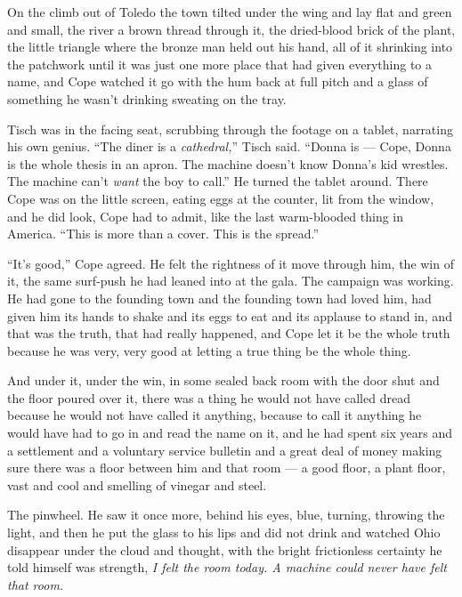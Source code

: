 \documentclass[11pt,openany]{book}
\newcommand{\scenebreak}{\par\vspace{0.5\baselineskip}\begin{center}\textasteriskcentered\quad\textasteriskcentered\quad\textasteriskcentered\end{center}\vspace{0.5\baselineskip}\par}
\begin{document}
\scenebreak


On the climb out of Toledo the town tilted under the wing and lay flat and green and small, the river a brown thread through it, the dried-blood brick of the plant, the little triangle where the bronze man held out his hand, all of it shrinking into the patchwork until it was just one more place that had given everything to a name, and Cope watched it go with the hum back at full pitch and a glass of something he wasn't drinking sweating on the tray.

Tisch was in the facing seat, scrubbing through the footage on a tablet, narrating his own genius. ``The diner is a \textit{cathedral,}'' Tisch said. ``Donna is --- Cope, Donna is the whole thesis in an apron. The machine doesn't know Donna's kid wrestles. The machine can't \textit{want} the boy to call.'' He turned the tablet around. There Cope was on the little screen, eating eggs at the counter, lit from the window, and he did look, Cope had to admit, like the last warm-blooded thing in America. ``This is more than a cover. This is the spread.''

``It's good,'' Cope agreed. He felt the rightness of it move through him, the win of it, the same surf-push he had leaned into at the gala. The campaign was working. He had gone to the founding town and the founding town had loved him, had given him its hands to shake and its eggs to eat and its applause to stand in, and that was the truth, that had really happened, and Cope let it be the whole truth because he was very, very good at letting a true thing be the whole thing.

And under it, under the win, in some sealed back room with the door shut and the floor poured over it, there was a thing he would not have called dread because he would not have called it anything, because to call it anything he would have had to go in and read the name on it, and he had spent six years and a settlement and a voluntary service bulletin and a great deal of money making sure there was a floor between him and that room --- a good floor, a plant floor, vast and cool and smelling of vinegar and steel.

The pinwheel. He saw it once more, behind his eyes, blue, turning, throwing the light, and then he put the glass to his lips and did not drink and watched Ohio disappear under the cloud and thought, with the bright frictionless certainty he told himself was strength, \textit{I felt the room today. A machine could never have felt that room.}
\end{document}
